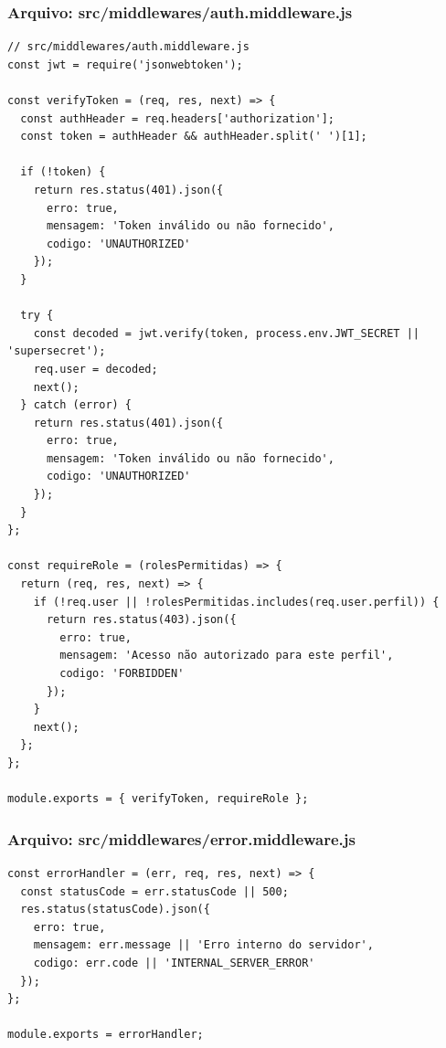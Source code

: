 \subsubsection*{Arquivo: src/middlewares/auth.middleware.js}
\begin{lstlisting}[caption={src/middlewares/auth.middleware.js}]
// src/middlewares/auth.middleware.js
const jwt = require('jsonwebtoken');

const verifyToken = (req, res, next) => {
  const authHeader = req.headers['authorization'];
  const token = authHeader && authHeader.split(' ')[1];

  if (!token) {
    return res.status(401).json({
      erro: true,
      mensagem: 'Token inválido ou não fornecido',
      codigo: 'UNAUTHORIZED'
    });
  }

  try {
    const decoded = jwt.verify(token, process.env.JWT_SECRET || 'supersecret');
    req.user = decoded;
    next();
  } catch (error) {
    return res.status(401).json({
      erro: true,
      mensagem: 'Token inválido ou não fornecido',
      codigo: 'UNAUTHORIZED'
    });
  }
};

const requireRole = (rolesPermitidas) => {
  return (req, res, next) => {
    if (!req.user || !rolesPermitidas.includes(req.user.perfil)) {
      return res.status(403).json({
        erro: true,
        mensagem: 'Acesso não autorizado para este perfil',
        codigo: 'FORBIDDEN'
      });
    }
    next();
  };
};

module.exports = { verifyToken, requireRole };\end{lstlisting}
\vspace{0.5cm}
\subsubsection*{Arquivo: src/middlewares/error.middleware.js}
\begin{lstlisting}[caption={src/middlewares/error.middleware.js}]
const errorHandler = (err, req, res, next) => {
  const statusCode = err.statusCode || 500;
  res.status(statusCode).json({
    erro: true,
    mensagem: err.message || 'Erro interno do servidor',
    codigo: err.code || 'INTERNAL_SERVER_ERROR'
  });
};

module.exports = errorHandler;
\end{lstlisting}
\vspace{0.5cm}
